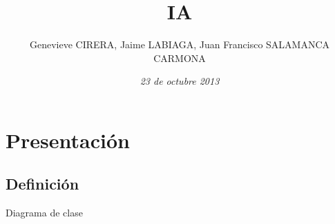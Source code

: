 \documentclass[11pt]{beamer}
\title{IA}
\author{Genevieve CIRERA, Jaime LABIAGA, Juan Francisco SALAMANCA CARMONA}\institute{UPM, Polytech'Nice-Sophia}
\date{\textit{23 de octubre 2013}}
\begin{document}
\begin{frame}
\titlepage
\end{frame}


\section{Presentación}

\subsection*{Definici\'on}
\begin{frame}{Diagrama de clase}

\end{frame}
\end{document}
